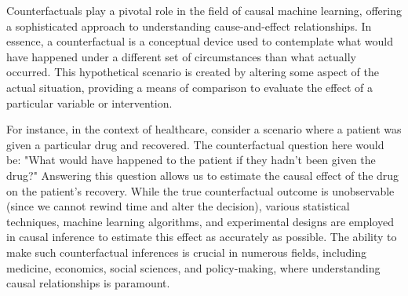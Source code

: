 Counterfactuals play a pivotal role in the field of causal machine learning, offering a sophisticated approach to understanding cause-and-effect relationships. In essence, a counterfactual is a conceptual device used to contemplate what would have happened under a different set of circumstances than what actually occurred. This hypothetical scenario is created by altering some aspect of the actual situation, providing a means of comparison to evaluate the effect of a particular variable or intervention.

For instance, in the context of healthcare, consider a scenario where a patient was given a particular drug and recovered. The counterfactual question here would be: "What would have happened to the patient if they hadn't been given the drug?" Answering this question allows us to estimate the causal effect of the drug on the patient's recovery. While the true counterfactual outcome is unobservable (since we cannot rewind time and alter the decision), various statistical techniques, machine learning algorithms, and experimental designs are employed in causal inference to estimate this effect as accurately as possible. The ability to make such counterfactual inferences is crucial in numerous fields, including medicine, economics, social sciences, and policy-making, where understanding causal relationships is paramount.




